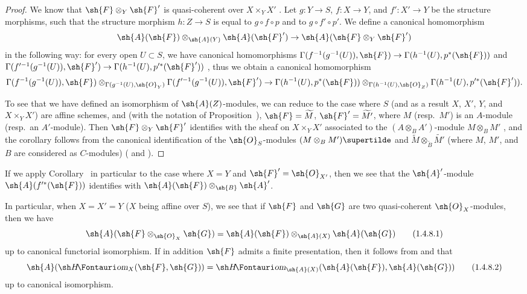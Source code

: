 \begin{proof}
We know that $\sh{F}\otimes_Y\sh{F}'$ is quasi-coherent over $X\times_Y X'$ .
Let $g:Y\to S$, $f:X\to Y$, and $f':X'\to Y$ be the structure morphisms, such that the structure morphism
$h:Z\to S$ is equal to $g\circ f\circ p$ and to $g\circ f'\circ p'$.
We define a canonical homomorphism
\[
  \sh{A}(\sh{F})\otimes_{\sh{A}(Y)}\sh{A}(\sh{F}')\to\sh{A}(\sh{F}\otimes_Y\sh{F}')
\]
in the following way: for every open $U\subset S$, we have canonical homomorphisms $\Gamma(f^{-1}(g^{-1}(U)),\sh{F})\to\Gamma(h^{-1}(U),p^*(\sh{F}))$ and $\Gamma(f^{\prime-1}(g^{-1}(U)),\sh{F}')\to\Gamma(h^{-1}(U),p^{\prime*}(\sh{F}'))$ , thus we obtain a canonical homomorphism
\[
  \Gamma(f^{-1}(g^{-1}(U)),\sh{F})\otimes_{\Gamma(g^{-1}(U),\sh{O}_Y)}\Gamma(f^{\prime-1}(g^{-1}(U)),\sh{F}')\to\Gamma(h^{-1}(U),p^*(\sh{F}))\otimes_{\Gamma(h^{-1}(U),\sh{O}_Z)}\Gamma(h^{-1}(U),p^{\prime*}(\sh{F}')).
\]

To see that we have defined an isomorphism of $\sh{A}(Z)$-modules, we can reduce to the case where $S$ (and as a result $X$, $X'$, $Y$, and $X\times_Y X'$) are affine schemes, and (with the notation of Proposition~), $\sh{F}=\widetilde{M}$, $\sh{F}'=\widetilde{M'}$, where $M$ (resp.~$M'$) is an $A$-module (resp.~an $A'$-module).
Then $\sh{F}\otimes_Y\sh{F}'$ identifies with the sheaf on $X\times_Y X'$ associated to the $(A\otimes_B A')$-module $M\otimes_B M'$ , and the corollary follows from the canonical identification of the $\sh{O}_S$-modules $(M\otimes_B M')\supertilde$ and $\widetilde{M}\otimes_{\widetilde{B}}\widetilde{M'}$ (where $M$, $M'$, and $B$ are considered as $C$-modules) ( and ).
\end{proof}

If we apply Corollary~ in particular to the case where $X=Y$ and $\sh{F}'=\sh{O}_{X'}$, then we see that the $\sh{A}'$-module $\sh{A}(f^{\prime*}(\sh{F}))$ identifies with $\sh{A}(\sh{F})\otimes_\sh{B}\sh{A}'$.

\begin{env}[1.4.8]
\label{II.1.4.8}
In particular, when $X=X'=Y$ ($X$ being affine over $S$), we see that if $\sh{F}$ and $\sh{G}$ are two quasi-coherent $\sh{O}_X$-modules, then we have
\[
\label{II.1.4.8.1}
  \sh{A}(\sh{F}\otimes_{\sh{O}_X}\sh{G})=\sh{A}(\sh{F})\otimes_{\sh{A}(X)}\sh{A}(\sh{G})
  \tag{1.4.8.1}
\]
up to canonical functorial isomorphism.
If in addition $\sh{F}$ admits a finite presentation, then it follows from  and  that
\[
\label{II.1.4.8.2}
  \sh{A}(\shHom_X(\sh{F},\sh{G}))=\shHom_{\sh{A}(X)}(\sh{A}(\sh{F}),\sh{A}(\sh{G}))
  \tag{1.4.8.2}
\]
up to canonical isomorphism.
\end{env}

